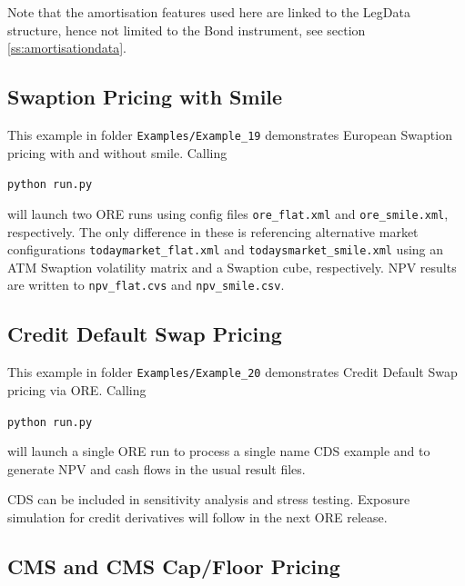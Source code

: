 \documentclass[12pt, a4paper]{article}
\begin{document}
\medskip
Note that the amortisation features used here are linked to the LegData structure, hence not limited to the Bond instrument, see section \ref{ss:amortisationdata}.

\subsection{Swaption Pricing with Smile}%

This example in folder {\tt Examples/Example\_19} demonstrates European Swaption pricing with and without smile. Calling

\medskip
\centerline{\tt python run.py}

\medskip
will launch two ORE runs using config files {\tt ore\_flat.xml} and {\tt ore\_smile.xml}, respectively. The only difference in these is referencing alternative market configurations {\tt todaymarket\_flat.xml} and {\tt todaysmarket\_smile.xml} using an ATM Swaption volatility matrix and a Swaption cube, respectively. NPV results are written to {\tt npv\_flat.cvs} and {\tt npv\_smile.csv}.

\subsection{Credit Default Swap Pricing}%

This example in folder {\tt Examples/Example\_20} demonstrates Credit Default Swap pricing via ORE. Calling

\medskip
\centerline{\tt python run.py}

\medskip
will launch a single ORE run to process a single name CDS example and to generate NPV and cash flows in the usual result files. 

\medskip
CDS can be included in sensitivity analysis and stress testing. Exposure simulation for credit derivatives will follow in the next ORE release.

\subsection{CMS and CMS Cap/Floor Pricing}%
\end{document}
